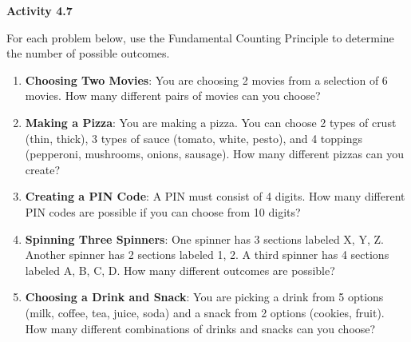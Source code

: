  \vspace{0.3ex}
\noindent\textbf{Activity 4.7}

\vspace{0.2ex}


For each problem below, use the Fundamental Counting Principle to determine the number of possible outcomes.
\begin{enumerate}[noitemsep, label = \color{blue}\arabic*. ]





    \item \textbf{Choosing Two Movies}: You are choosing 2 movies from a selection of 6 movies. How many different pairs of movies can you choose?

    \item \textbf{Making a Pizza}: You are making a pizza. You can choose 2 types of crust (thin, thick), 3 types of sauce (tomato, white, pesto), and 4 toppings (pepperoni, mushrooms, onions, sausage). How many different pizzas can you create?

    \item \textbf{Creating a PIN Code}: A PIN must consist of 4 digits. How many different PIN codes are possible if you can choose from 10 digits?

    \item \textbf{Spinning Three Spinners}: One spinner has 3 sections labeled X, Y, Z. Another spinner has 2 sections labeled 1, 2. A third spinner has 4 sections labeled A, B, C, D. How many different outcomes are possible?

    \item \textbf{Choosing a Drink and Snack}: You are picking a drink from 5 options (milk, coffee, tea, juice, soda) and a snack from 2 options (cookies, fruit). How many different combinations of drinks and snacks can you choose?
\end{enumerate}


